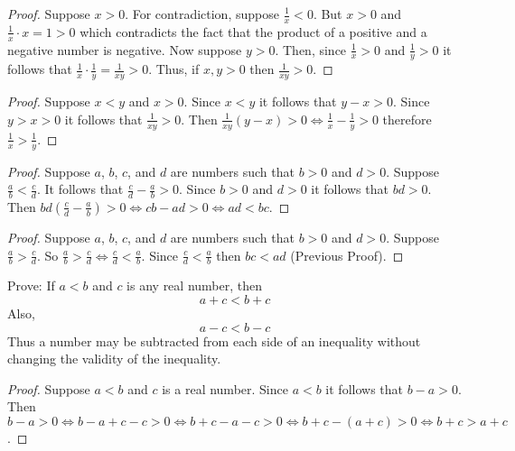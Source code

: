 \begin{proof}
    Suppose $x > 0$.
    For contradiction, suppose $\frac{1}{x} < 0$.
    But $x > 0$ and $\frac{1}{x} \cdot x = 1 > 0$
        which contradicts the fact that the product 
        of a positive and a negative number is negative.
    Now suppose $y > 0$. Then, since $\frac{1}{x} > 0$ and $\frac{1}{y} > 0$
        it follows that $\frac{1}{x} \cdot \frac{1}{y} = \frac{1}{xy} > 0$.
    Thus, if $x, y > 0$ then $\frac{1}{xy} > 0$.
\end{proof}

\begin{proof}
    Suppose $x < y$ and $x > 0$.
    Since $x < y$ it follows that $y - x > 0$.
    Since $y > x > 0$ it follows that $\frac{1}{xy} > 0$.
    Then $\frac{1}{xy}(y - x) > 0 \iff \frac{1}{x} - \frac{1}{y} > 0$
        therefore $\frac{1}{x} > \frac{1}{y}$.
\end{proof}

\begin{proof}
    Suppose $a$, $b$, $c$, and $d$ are numbers such that $b > 0$ and $d > 0$.
    Suppose $\frac{a}{b} < \frac{c}{d}$.
    It follows that $\frac{c}{d} - \frac{a}{b} > 0$.
    Since $b > 0$ and $d > 0$ it follows that $bd > 0$.
    Then $bd(\frac{c}{d} - \frac{a}{b}) > 0 \iff cb - ad > 0 \iff ad < bc$.
\end{proof}

\begin{proof}
    Suppose $a$, $b$, $c$, and $d$ are numbers such that $b > 0$ and $d > 0$.
    Suppose $\frac{a}{b} > \frac{c}{d}$.
    So $\frac{a}{b} > \frac{c}{d} \iff \frac{c}{d} < \frac{a}{b}$.
    Since $\frac{c}{d} < \frac{a}{b}$ then $bc < ad$ (Previous Proof).
\end{proof}

\begin{tcolorbox}[title=Problem 5, breakable]
    Prove: If $a < b$ and $c$ is any real number, then 
    \[a + c < b + c\]
    Also,
    \[a - c < b - c\]
    Thus a number may be subtracted from each side of an inequality
    without changing the validity of the inequality.
\end{tcolorbox}

\begin{proof}
    Suppose $a < b$ and $c$ is a 
    real number.
    Since $a < b$ it follows that $b - a > 0$.
    Then $b - a > 0 
            \iff b - a + c -c > 0 
            \iff b + c - a - c > 0 
            \iff b + c - (a + c) > 0 \iff b + c > a + c$.
\end{proof}

